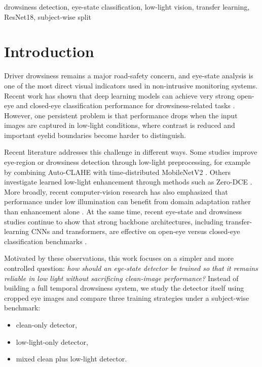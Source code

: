 \documentclass[conference]{IEEEtran}
\begin{document}
\begin{IEEEkeywords}
drowsiness detection, eye-state classification, low-light vision, transfer learning, ResNet18, subject-wise split
\end{IEEEkeywords}

\section{Introduction}

Driver drowsiness remains a major road-safety concern, and eye-state analysis is one of the most direct visual indicators used in non-intrusive monitoring systems. Recent work has shown that deep learning models can achieve very strong open-eye and closed-eye classification performance for drowsiness-related tasks \cite{hassan2025,florez2024,kim2017}. However, one persistent problem is that performance drops when the input images are captured in low-light conditions, where contrast is reduced and important eyelid boundaries become harder to distinguish.

Recent literature addresses this challenge in different ways. Some studies improve eye-region or drowsiness detection through low-light preprocessing, for example by combining Auto-CLAHE with time-distributed MobileNetV2 \cite{alzami2024}. Others investigate learned low-light enhancement through methods such as Zero-DCE \cite{guo2020}. More broadly, recent computer-vision research has also emphasized that performance under low illumination can benefit from domain adaptation rather than enhancement alone \cite{du2024}. At the same time, recent eye-state and drowsiness studies continue to show that strong backbone architectures, including transfer-learning CNNs and transformers, are effective on open-eye versus closed-eye classification benchmarks \cite{hassan2025}.

Motivated by these observations, this work focuses on a simpler and more controlled question: \emph{how should an eye-state detector be trained so that it remains reliable in low light without sacrificing clean-image performance?} Instead of building a full temporal drowsiness system, we study the detector itself using cropped eye images and compare three training strategies under a subject-wise benchmark:

\begin{itemize}
\item clean-only detector,
\item low-light-only detector,
\item mixed clean plus low-light detector.
\end{itemize}
\end{document}

